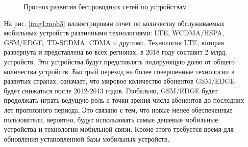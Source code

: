 \pgfplotsset{width=15cm, height=10cm, compat=1.3}
\begin{figure} [!h]
  \center
{}
\caption{Прогноз развития беспроводных сетей по устройствам \cite{ericsson}}
  \label{img1:mob2}
\end{figure}




На рис. \ref{img1:mob3} иллюстрирован отчет по количеству обслуживаемых мобильных устройств различными технологиями: LTE, WCDMA/HSPA,\\ GSM/EDGE, TD-SCDMA, CDMA и другими. Технология LTE, которая развернута и представлена во всех регионах, в 2018 году составит 2 млрд. устройств. Эти устройства будут представлять лидирующую долю от общего количества устройств. Быстрый переход на более совершенные технологии в развитых странах, означает, что мировое количество абонентов GSM/EDGE будет снижаться после 2012-2013 годов. Глобально, GSM/EDGE будет продолжать играть ведущую роль с точки зрения числа абонентов до последних лет прогнозного периода. Это связано с тем, что новые менее обеспеченные пользователи, вероятно, будут использовать самые дешевые мобильные устройства и технологии мобильной связи. Кроме этого требуется время для обновления установленной базы мобильных устройств.


